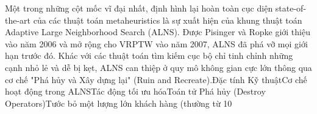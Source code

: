 \documentclass[13pt, a4paper]{extarticle} %
\begin{document}
Một trong những cột mốc vĩ đại nhất, định hình lại hoàn toàn cục diện state-of-the-art của các thuật toán metaheuristics là sự xuất hiện của khung thuật toán Adaptive Large Neighborhood Search (ALNS). Được Pisinger và Ropke giới thiệu vào năm 2006 và mở rộng cho VRPTW vào năm 2007, ALNS đã phá vỡ mọi giới hạn trước đó. Khác với các thuật toán tìm kiếm cục bộ chỉ tinh chỉnh những cạnh nhỏ lẻ và dễ bị kẹt, ALNS can thiệp ở quy mô không gian cực lớn thông qua cơ chế "Phá hủy và Xây dựng lại" (Ruin and Recreate).Đặc tính Kỹ thuậtCơ chế hoạt động trong ALNSTác động tối ưu hóaToán tử Phá hủy (Destroy Operators)Tước bỏ một lượng lớn khách hàng (thường từ 10%
\end{document}
